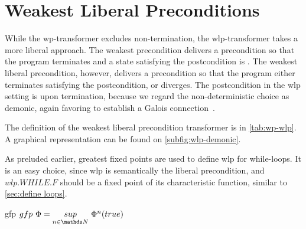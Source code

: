 











\section{Weakest Liberal Preconditions}\label{sec:wlp}
While the wp-transformer excludes non-termination, the wlp-transformer takes a more liberal approach. 
The weakest precondition delivers a precondition so that the program terminates and a state satisfying the postcondition is . 
The weakest liberal precondition, however, delivers a precondition so that the program either terminates satisfying the postcondition, or diverges. 
The postcondition in the wlp setting is  upon termination, because we regard the non-deterministic choice as demonic, again favoring to establish a Galois connection~\cite{zhang22}. 

The definition of the weakest liberal precondition transformer is in \autoref{tab:wp-wlp}. 
A graphical representation can be found on \autoref{subfig:wlp-demonic}. 

As preluded earlier, greatest fixed points are used to define wlp for while-loops. 
It is an easy choice, since wlp is semantically the  liberal precondition, and $wlp.WHILE.F$ should be a fixed point of its characteristic function, similar to \autoref{sec:define loops}. 

\begin{theorem}{gfp}{\normalfont\cite{kaminski19}}
  $gfp\ \Phi = \underset{n\in\N}{sup}\ \Phi^n(true)$
\end{theorem}





